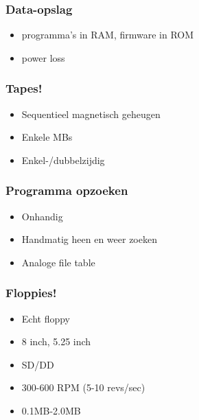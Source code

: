 \documentclass[aspectratio=43]{uva-inf-presentation}
\begin{document}

\begin{frame}
\frametitle{Data-opslag}

\begin{itemize}
\item programma's in RAM, firmware in ROM
\item power loss
\end{itemize}

\end{frame}


\begin{frame}
\frametitle{Tapes!}

\begin{itemize}
\item Sequentieel magnetisch geheugen
\item Enkele MBs
\item Enkel-/dubbelzijdig
\end{itemize}

\end{frame}


\begin{frame}
\frametitle{Programma opzoeken}

\begin{itemize}
\item Onhandig
\item Handmatig heen en weer zoeken
\item Analoge file table
\end{itemize}

\end{frame}


\begin{frame}
\frametitle{Floppies!}

\begin{itemize}
\item Echt floppy
\item 8 inch, 5.25 inch
\item SD/DD
\item 300-600 RPM (5-10 revs/sec)
\item 0.1MB-2.0MB
\end{itemize}

\end{frame}
\end{document}
